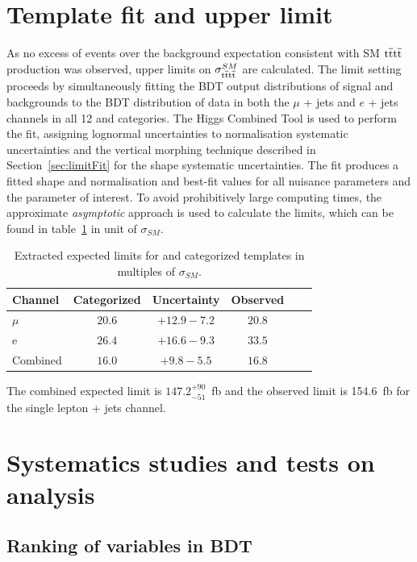 \section{Template fit and upper limit}
\label{sec:limit13}
As no excess of events over the background expectation consistent with SM $\mathrm{t}\overline{\mathrm{t}}\mathrm{t}\overline{\mathrm{t}}$ production was observed, upper limits on $\sigma_{\mathrm{t}\overline{\mathrm{t}}\mathrm{t}\overline{\mathrm{t}}}^{SM}$ are calculated. 
The limit setting proceeds by simultaneously fitting the BDT output distributions of signal and backgrounds to the BDT distribution of data in both the $\mu$ + jets and $e$ + jets channels in all 12 \njets and \nMtags categories. The Higgs Combined Tool is used to perform the fit, assigning lognormal uncertainties to normalisation systematic uncertainties and the vertical morphing technique described in Section~\ref{sec:limitFit} for the shape systematic uncertainties. The fit produces a fitted shape and normalisation and best-fit values for all nuisance parameters and the parameter of interest. 
To avoid prohibitively large computing times, the approximate \emph{asymptotic} approach is used to calculate the \CLS limits, which can be found in table~\ref{tab:limits} in unit of $\sigma_{SM}$. 

\begin{table}[ht!]
\centering
\begin{tabular}{| l | c | c | c | c | c |}
  \hline
Channel  & Categorized & Uncertainty & Observed\\
 \hline
$\mu$  &$20.6$ & $+12.9 -7.2$ & $20.8$ \\
 \hline
e  &  $26.4$ & $+16.6 -9.3$ & $33.5$ \\
 \hline
 Combined  &  $16.0$ & $+9.8 -5.5$ & $16.8$ \\
 \hline
\end{tabular}
 \caption{Extracted expected limits for \njets and \nMtags categorized templates in multiples of $\sigma_{SM}$.}
  \label{tab:limits}
  \end{table}

The combined expected limit is $147.2^{+90}_{-51}$~fb and the observed limit is 154.6~fb for the single lepton + jets channel.

\section{Systematics studies and tests on analysis}

\subsection{Ranking of variables in BDT}


